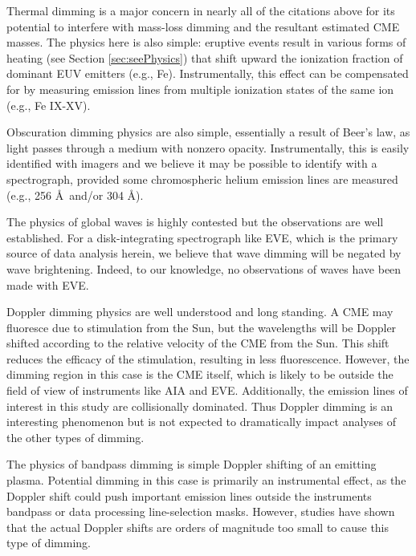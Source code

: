 Thermal dimming is a major concern in nearly all of the citations above for its potential to interfere with mass-loss dimming and the resultant estimated CME masses. The physics here is also simple: eruptive events result in various forms of heating (see Section \ref{sec:seePhysics}) that shift upward the ionization fraction of dominant EUV emitters (e.g., Fe). Instrumentally, this effect can be compensated for by measuring emission lines from multiple ionization states of the same ion (e.g., Fe IX-XV).

Obscuration dimming physics are also simple, essentially a result of Beer's law, as light passes through a medium with nonzero opacity. Instrumentally, this is easily identified with imagers and we believe it may be possible to identify with a spectrograph, provided some chromospheric helium emission lines are measured (e.g., 256 \AA\ and/or 304 \AA). 

The physics of global waves is highly contested but the observations are well established. For a disk-integrating spectrograph like EVE, which is the primary source of data analysis herein, we believe that wave dimming will be negated by wave brightening. Indeed, to our knowledge, no observations of waves have been made with EVE. 

Doppler dimming physics are well understood and long standing. A CME may fluoresce due to stimulation from the Sun, but the wavelengths will be Doppler shifted according to the relative velocity of the CME from the Sun. This shift reduces the efficacy of the stimulation, resulting in less fluorescence. However, the dimming region in this case is the CME itself, which is likely to be outside the field of view of instruments like AIA and EVE. Additionally, the emission lines of interest in this study are collisionally dominated. Thus Doppler dimming is an interesting phenomenon but is not expected to dramatically impact analyses of the other types of dimming. 

The physics of bandpass dimming is simple Doppler shifting of an emitting plasma. Potential dimming in this case is primarily an instrumental effect, as the Doppler shift could push important emission lines outside the instruments bandpass or data processing line-selection masks. However, studies have shown that the actual Doppler shifts are orders of magnitude too small to cause this type of dimming. 
